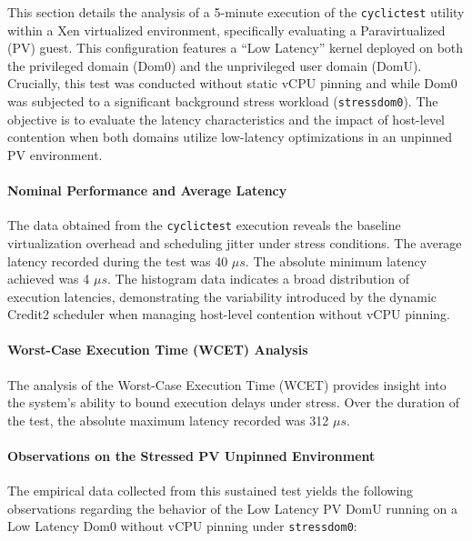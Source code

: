 This section details the analysis of a 5-minute execution of the
\texttt{cyclictest} utility within a Xen virtualized environment,
specifically evaluating a Paravirtualized (PV) guest. This configuration
features a ``Low Latency'' kernel deployed on both the privileged domain
(Dom0) and the unprivileged user domain (DomU). Crucially, this test was
conducted without static vCPU pinning and while Dom0 was subjected to a
significant background stress workload (\texttt{stressdom0}). The
objective is to evaluate the latency characteristics and the impact of
host-level contention when both domains utilize low-latency
optimizations in an unpinned PV environment.

\paragraph{Nominal Performance and Average
Latency}\label{nominal-performance-and-average-latency-25}

The data obtained from the \texttt{cyclictest} execution reveals the
baseline virtualization overhead and scheduling jitter under stress
conditions. The average latency recorded during the test was 40 $\mu s$. The
absolute minimum latency achieved was 4 $\mu s$. The histogram data indicates
a broad distribution of execution latencies, demonstrating the
variability introduced by the dynamic Credit2 scheduler when managing
host-level contention without vCPU pinning.

\paragraph{Worst-Case Execution Time (WCET)
Analysis}\label{worst-case-execution-time-wcet-analysis-27}

The analysis of the Worst-Case Execution Time (WCET) provides insight
into the system's ability to bound execution delays under stress. Over
the duration of the test, the absolute maximum latency recorded was 312
$\mu s$.

\paragraph{Observations on the Stressed PV Unpinned
Environment}\label{observations-on-the-stressed-pv-unpinned-environment}

The empirical data collected from this sustained test yields the
following observations regarding the behavior of the Low Latency PV DomU
running on a Low Latency Dom0 without vCPU pinning under
\texttt{stressdom0}:

